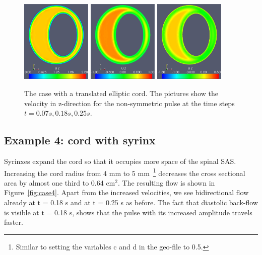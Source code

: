\begin{figure}
\center
\includegraphics[width=0.3\textwidth]{chapters/hentschel/pdf/pulse_f1_08_elliptic_eccentric_sysmax_nmb7.pdf}
\includegraphics[width=0.3\textwidth]{chapters/hentschel/pdf/pulse_f1_08_elliptic_eccentric_sysdia_nmb18.pdf}
\includegraphics[width=0.3\textwidth]{chapters/hentschel/pdf/pulse_f1_08_elliptic_eccentric_diamin1_nmb25.pdf}
\caption{The case with a translated elliptic cord. The pictures show the
velocity in z-direction for the non-symmetric pulse at the time steps
$t=0.07s, 0.18s, 0.25s$.}
\label{fig:case3b}
\end{figure}

\subsection{Example 4: cord with syrinx}

Syrinxes expand the cord so that it occupies more space of the spinal
SAS. Increasing the cord radius from 4 mm to 5 mm~\footnote{Similar to
setting the variables c and d in the geo-file to 0.5.} decreases the
cross sectional area by almost one third to 0.64 $\mathrm{cm^2}$. The
resulting flow is shown in Figure~\ref{fig:case4}. Apart from the
increased velocities, we see bidirectional flow already at t = 0.18 s
and at t = 0.25 s as before. The fact that diastolic back-flow is
visible at t = 0.18 s, shows that the pulse with its increased
amplitude travels faster.

